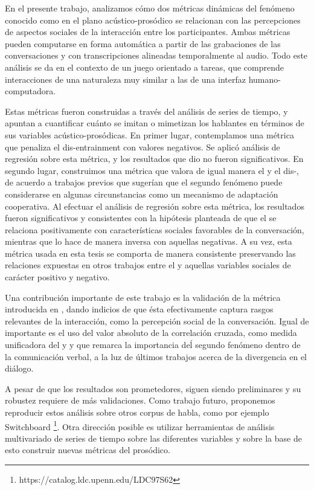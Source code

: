 En el presente trabajo, analizamos cómo dos métricas dinámicas del fenómeno conocido como \entrainment en el plano acústico-prosódico se relacionan con las percepciones de aspectos sociales de la interacción entre los participantes. Ambas métricas pueden computarse en forma automática a partir de las grabaciones de las conversaciones y con transcripciones  alineadas temporalmente al audio. Todo este análisis se da en el contexto de un juego orientado a tareas, que comprende interacciones de una naturaleza muy similar a las de una interfaz humano-computadora.

Estas métricas fueron construidas a través del análisis de series de tiempo, y apuntan a cuantificar cuánto se imitan o mimetizan los hablantes en términos de sus variables acústico-prosódicas. En primer lugar, contemplamos una métrica que penaliza el dis-entrainment con valores negativos. Se aplicó análisis de regresión sobre esta métrica, y los resultados que dio no fueron significativos. En segundo lugar, construimos una métrica que valora de igual manera el \entrainment y el dis-\entrainment, de acuerdo a trabajos previos que sugerían que el segundo fenómeno puede considerarse en algunas circunstancias como un mecanismo de adaptación cooperativa. Al efectuar el análisis de regresión sobre esta métrica, los resultados fueron significativos y consistentes con la hipótesis planteada de que el \entrainment se relaciona positivamente con características sociales favorables de la conversación, mientras que lo hace de manera inversa con aquellas negativas. A su vez, esta métrica usada en esta tesis se comporta de manera consistente preservando las relaciones expuestas en otros trabajos entre el \entrainment y aquellas variables sociales de carácter positivo y negativo. 

Una contribución importante de este trabajo es la validación de la métrica introducida en \cite{KOU2008.2}, dando indicios de que ésta efectivamente captura rasgos relevantes de la interacción, como la percepción social de la conversación. Igual de importante es el uso del valor absoluto de la correlación cruzada, como medida unificadora del \entrainment y \disentrainment y que remarca la importancia deĺ segundo fenómeno dentro de la comunicación verbal, a la luz de últimos trabajos acerca de la divergencia en el diálogo.

A pesar de que los resultados son prometedores, siguen siendo preliminares y su robustez requiere de más validaciones. Como trabajo futuro, proponemos reproducir estos análisis sobre otros corpus de habla, como por ejemplo Switchboard \footnote{https://catalog.ldc.upenn.edu/LDC97S62}. Otra dirección posible es utilizar herramientas de análisis multivariado de series de tiempo sobre las diferentes variables \ap y sobre la base de esto construir nuevas métricas del \entrainment prosódico.
